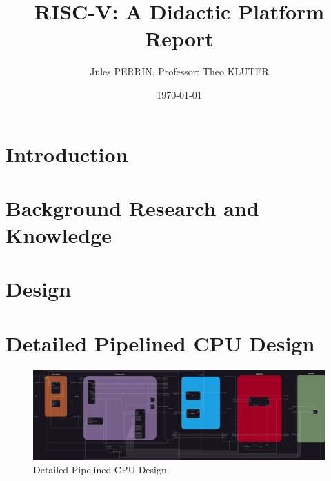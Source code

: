 \documentclass[12pt]{article}
\title{RISC-V: A Didactic Platform \\
Report}
\author{Jules PERRIN, Professor: Theo KLUTER}
\date{\today}
\begin{document}
\maketitle
\tableofcontents

\section{Introduction}




\section{Background Research and Knowledge}






\section{Design}





\printbibliography[heading=bibintoc]

\appendix
\section{Detailed Pipelined CPU Design}
\label{appendix:pipelined_design}
\begin{figure}
    \centering
    \includegraphics[width=\textheight]{appendix/images/pipelined_design_detail.png} %
    \caption{Detailed Pipelined CPU Design}
\end{figure}
\end{document}
